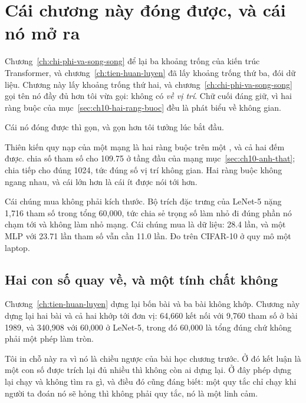 \section{Cái chương này đóng được, và cái nó mở ra}
\label{sec:ch10-con-lai-gi}

%
Chương~\ref{ch:chi-phi-va-song-song} để lại ba khoảng trống của kiến trúc
Transformer, và chương~\ref{ch:tien-huan-luyen} đã lấy khoảng trống thứ ba, đói
dữ liệu. Chương này lấy khoảng trống thứ hai, và
chương~\ref{ch:chi-phi-va-song-song} gọi tên nó đầy đủ hơn tôi vừa gọi: không
có  \emph{về vị trí}. Chữ cuối đáng giữ,
vì hai ràng buộc của mục~\ref{sec:ch10-hai-rang-buoc} đều là phát biểu về không
gian.

Cái nó đóng được thì gọn, và gọn hơn tôi tưởng lúc bắt đầu.

Thiên kiến quy nạp của một mạng  là hai ràng buộc trên một
, và cả hai đếm được.
 chia số tham số cho 109.75 ở tầng đầu của mạng
mục~\ref{sec:ch10-anh-that};  chia tiếp
cho đúng 1024, tức đúng số vị trí không gian. Hai ràng buộc không ngang nhau, và cái lớn hơn là cái ít
được nói tới hơn.

Cái chúng mua không phải kích thước. Bộ trích đặc trưng của LeNet-5 nặng 1,716
tham số trong tổng 60,000, tức chia sẻ trọng số làm nhỏ đi đúng phần nó chạm
tới và không làm nhỏ mạng. Cái chúng mua là dữ liệu: 28.4 lần, và một MLP với
23.71 lần tham số vẫn cần 11.0 lần. Đo trên CIFAR-10 ở quy mô một laptop.

\subsection*{Hai con số quay về, và một tính chất không}

%
Chương~\ref{ch:tien-huan-luyen} dựng lại bốn bài và ba bài không khớp. Chương
này dựng lại hai bài và cả hai khớp tới đơn vị: 64,660 kết nối với 9,760 tham
số ở bài 1989, và 340,908 với 60,000 ở LeNet-5, trong đó 60,000 là tổng đúng
chứ không phải một phép làm tròn.

Tôi in chỗ này ra vì nó là chiều ngược của bài học chương trước. Ở đó kết luận
là một con số được trích lại đủ nhiều thì không còn ai dựng lại. Ở đây phép
dựng lại chạy và không tìm ra gì, và điều đó cũng đáng biết: một quy tắc chỉ
chạy khi người ta đoán nó sẽ hỏng thì không phải quy tắc, nó là một linh cảm.

